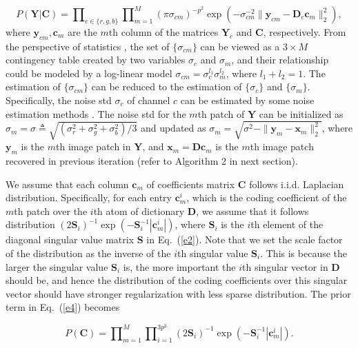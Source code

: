 \begin{equation}
\label{e5}
P(\bm{Y}|\bm{C}) 
= 
\prod\nolimits_{c\in\{r, g, b\}}
\prod\nolimits_{m=1}^{M}
(\pi\sigma_{cm})^{-p^{2}}
\exp(-\sigma_{cm}^{-2}\|\bm{y}_{cm}-\bm{D}_{c}\bm{c}_{m}\|_{2}^{2}),
\end{equation}
where $\bm{y}_{cm},\bm{c}_{m}$ are the $m$th column of the matrices $\bm{Y}_{c}$ and $\bm{C}$, respectively. From the perspective of statistics \cite{glm}, the set of $\{\sigma_{cm}\}$ can be viewed as a $3\times M$ contingency table created by two variables $\sigma_{c}$ and $\sigma_{m}$, and their relationship could be modeled by a log-linear model $\sigma_{cm}=\sigma_{c}^{l_{1}}\sigma_{m}^{l_{2}}$, where $l_{1}+l_{2}=1$. The estimation of $\{\sigma_{cm}\}$ can be reduced to the estimation of $\{\sigma_{c}\}$ and $\{\sigma_{m}\}$. Specifically, the noise std $\sigma_{c}$ of channel $c$ can be estimated by some noise estimation methods \cite{Chen2015ICCV}. The noise std for the $m$th patch of $\bm{Y}$ can be initialized as 
$
\sigma_{m}=\sigma\triangleq \sqrt{(\sigma_{r}^{2}+\sigma_{g}^{2}+\sigma_{b}^{2})/3}
$
and updated as $\sigma_{m}=\sqrt{\sigma^2-\|\bm{y}_{m}-\bm{x}_{m}\|_{2}^{2}}$, where $\bm{y}_{m}$ is the $m$th image patch in $\bm{Y}$, and $\bm{x}_{m}=\bm{D}\bm{c}_{m}$ is the $m$th image patch recovered in previous iteration (refer to Algorithm 2 in next section).\

We assume that each column $\bm{c}_{m}$ of coefficients matrix $\bm{C}$ follows i.i.d. Laplacian distribution. Specifically, for each entry $\bm{c}_{m}^{i}$, which is the coding coefficient of the $m$th patch over the $i$th atom of dictionary $\bm{D}$, we assume that it follows distribution  $(2\bm{S}_{i})^{-1}\exp(-\bm{S}_{i}^{-1}|\bm{c}_{m}^{i}|)$, where $\bm{S}_{i}$ is the $i$th element of the diagonal singular value matrix $\bm{S}$ in Eq.\ (\ref{e2}). Note that we set the scale factor of the distribution as the inverse of the $i$th singular value $\bm{S}_{i}$. This is because the larger the singular value $\bm{S}_{i}$ is, the more important the $i$th singular vector in $\bm{D}$ should be, and hence the distribution of the coding coefficients over this singular vector should have stronger regularization with less sparse distribution. The prior term in Eq.\ (\ref{e4}) becomes

\begin{equation}
\label{e6}
P(\bm{C})
=
\prod\nolimits_{m=1}^{M}
\prod\nolimits_{i=1}^{3p^{2}}
(2\bm{S}_{i})^{-1}\exp(-\bm{S}_{i}^{-1}|\bm{c}_{m}^{i}|).
\end{equation}


